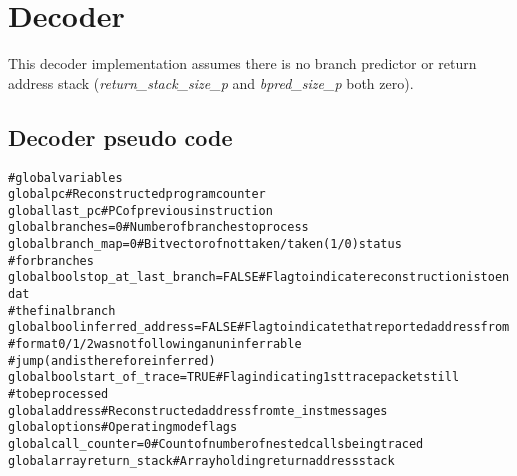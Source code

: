 \chapter{Decoder}

This decoder implementation assumes there is no branch predictor or return address 
stack (\textit{return\_stack\_size\_p} and \textit{bpred\_size\_p} both zero).

\section{Decoder pseudo code}

\begin{alltt}
# global variables
global       pc                          # Reconstructed program counter
global       last_pc                     # PC of previous instruction
global       branches = 0                # Number of branches to process
global       branch_map = 0              # Bit vector of not taken/taken (1/0) status
                                         #   for branches
global bool  stop_at_last_branch = FALSE # Flag to indicate reconstruction is to end at
                                         #   the final branch
global bool  inferred_address = FALSE    # Flag to indicate that reported address from
                                         #   format 0/1/2 was not following an uninferrable
                                         #   jump (and is therefore inferred)
global bool  start_of_trace = TRUE       # Flag indicating 1st trace packet still
                                         #   to be processed
global       address                     # Reconstructed address from te_inst messages
global       options                     # Operating mode flags
global       call_counter = 0            # Count of number of nested calls being traced
global array return_stack                # Array holding return address stack
\end{alltt}

\pagebreak

